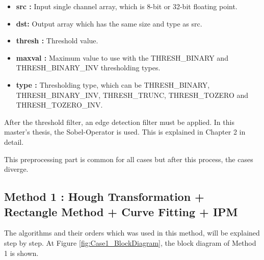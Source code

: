 \begin{itemize}

\item \textbf{src : }Input single channel array, which is 8-bit or 32-bit floating point.

\item \textbf{dst: }Output array which has the same size and type as src. 

\item \textbf{thresh : }Threshold value.

\item \textbf{maxval : }Maximum value to use with the THRESH\_BINARY and THRESH\_BINARY\_INV thresholding types.

\item \textbf{type : }Thresholding type, which can be THRESH\_BINARY, THRESH\_BINARY\_INV, THRESH\_TRUNC, THRESH\_TOZERO and THRESH\_TOZERO\_INV.

\end{itemize}






















After the threshold filter, an edge detection filter must be applied. In this master's thesis, the Sobel-Operator is used. This is explained in Chapter 2 in detail.
 
This preprocessing part is common for all cases but after this process, the cases diverge. 
 
%
\subsection{Method 1 : Hough Transformation + Rectangle Method + Curve Fitting + IPM}\label{sec:Case 1}

The algorithms and their orders which was used in this method, will be explained step by step. At Figure \ref{fig:Case1_BlockDiagram}, the block diagram of Method 1 is shown.



